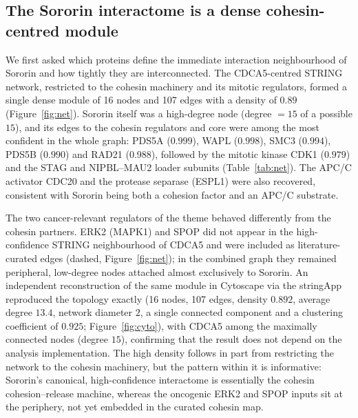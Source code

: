\documentclass[11pt]{article}
\begin{document}
\subsection{The Sororin interactome is a dense cohesin-centred module}
We first asked which proteins define the immediate interaction neighbourhood of Sororin and how tightly they are interconnected. The CDCA5-centred STRING network, restricted to the cohesin machinery and its mitotic regulators, formed a single dense module of 16 nodes and 107 edges with a density of $0.89$ (Figure~\ref{fig:net}). Sororin itself was a high-degree node (degree $=15$ of a possible $15$), and its edges to the cohesin regulators and core were among the most confident in the whole graph: PDS5A ($0.999$), WAPL ($0.998$), SMC3 ($0.994$), PDS5B ($0.990$) and RAD21 ($0.988$), followed by the mitotic kinase CDK1 ($0.979$) and the STAG and NIPBL--MAU2 loader subunits (Table~\ref{tab:net}). The APC/C activator CDC20 and the protease separase (ESPL1) were also recovered, consistent with Sororin being both a cohesion factor and an APC/C substrate.

The two cancer-relevant regulators of the theme behaved differently from the cohesin partners. ERK2 (MAPK1) and SPOP did not appear in the high-confidence STRING neighbourhood of CDCA5 and were included as literature-curated edges (dashed, Figure~\ref{fig:net}); in the combined graph they remained peripheral, low-degree nodes attached almost exclusively to Sororin. An independent reconstruction of the same module in Cytoscape via the stringApp reproduced the topology exactly (16 nodes, 107 edges, density $0.892$, average degree $13.4$, network diameter $2$, a single connected component and a clustering coefficient of $0.925$; Figure~\ref{fig:cyto}), with CDCA5 among the maximally connected nodes (degree $15$), confirming that the result does not depend on the analysis implementation. The high density follows in part from restricting the network to the cohesin machinery, but the pattern within it is informative: Sororin's canonical, high-confidence interactome is essentially the cohesin cohesion--release machine, whereas the oncogenic ERK2 and SPOP inputs sit at the periphery, not yet embedded in the curated cohesin map.
\end{document}
